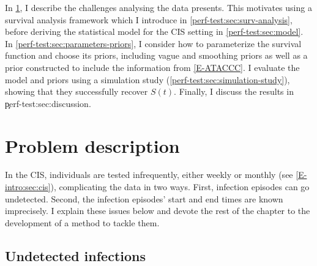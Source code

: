\documentclass[thesis.tex]{subfiles}
\begin{document}
In \cref{perf-test:sec:problem}, I describe the challenges analysing the data presents.
This motivates using a survival analysis framework which I introduce in \cref{perf-test:sec:surv-analysis}, before deriving the statistical model for the CIS setting in \cref{perf-test:sec:model}.
In \cref{perf-test:sec:parameters-priors}, I consider how to parameterize the survival function and choose its priors, including vague and smoothing priors as well as a prior constructed to include the information from \cref{E-ATACCC}.
I evaluate the model and priors using a simulation study (\cref{perf-test:sec:simulation-study}), showing that they successfully recover $S(t)$.
Finally, I discuss the results in \c{perf-test:sec:discussion}.

\section{Problem description} \label{perf-test:sec:problem}

In the CIS, individuals are tested infrequently, either weekly or monthly (see \cref{E-intro:sec:cis}), complicating the data in two ways.
First, infection episodes can go undetected.
Second, the infection episodes' start and end times are known imprecisely.
I explain these issues below and devote the rest of the chapter to the development of a method to tackle  them.

\subsection{Undetected infections} \label{perf-test:sec:undetected}
\end{document}
